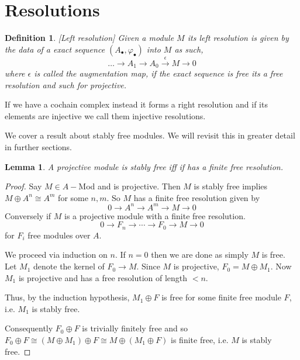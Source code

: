 \documentclass[12pt]{report}
\numberwithin{equation}{section}
\newtheorem{definition}[dummy]{Definition}
\newtheorem{lemma}[dummy]{Lemma}
\begin{document}
%	
	\section{Resolutions}
	
	\begin{definition}\label{defresolution}[Left resolution]
		Given a module $M$ its {left resolution} is given by the data of a exact sequence $(A_\bullet, \varphi_\bullet)$ into $M$ as such,
		\[ 	\dots \to A_1	\to A_0 \xrightarrow{\epsilon} M \to 0 \]
		where $\epsilon $ is called the {augmentation map}, if the exact sequence is free its a free resolution and such for projective. 
	\end{definition}
	
	
	If we have a cochain complex instead it forms a {right resolution} and if its elements are injective we call them injective resolutions.
	
	We cover a result about stably free modules. We will revisit this in greater detail in further sections.
		\begin{lemma}\label{stabfreefinfreeres}
		A projective module is stably free iff if has a finite free resolution.
	\end{lemma}
	\begin{proof}
		Say $M \in A-$Mod and is projective. Then $M$ is stably free implies $M \oplus A^n \cong A^m$ for some $n,m$. So $M$ has a finite free resolution given by
		\[ 0 \to A^n \to A^m \to M \to 0 \]
		Conversely if $M$ is a projective module with a finite free resolution.
		\[ 0 \to F_n \to \cdots \to F_0 \to M \to 0 \] for $F_i$ free modules over $A$.
		
		We proceed via induction on $n$. If $n=0$ then we are done as simply $M$ is free.
		Let $M_1$ denote the kernel of $F_0 \to M$. Since $M$ is projective, $F_0 = M \oplus M_1$. Now $M_1$ is projective and has a free resolution of length $< n$.
		
		Thus, by the induction hypothesis, $M_1 \oplus F$ is free for some finite free module $F$, i.e. $M_1$ is stably free.
		
		Consequently $F_0 \oplus F$ is trivially finitely free and so $F_0\oplus F \cong (M\oplus M_1) \oplus F \cong M \oplus (M_1 \oplus F)$ is finite free, i.e. $M$ is stably free.
	\end{proof}
	
\end{document}
